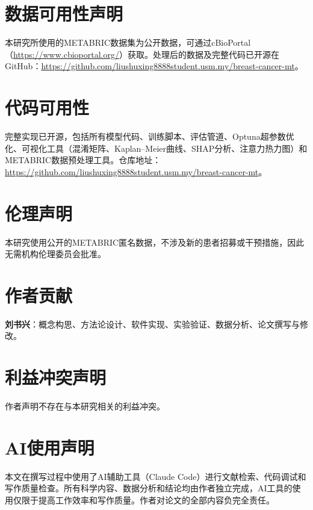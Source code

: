 \documentclass[conference]{IEEEtran}
\begin{document}

\section*{数据可用性声明}

本研究所使用的METABRIC数据集为公开数据，可通过cBioPortal（\url{https://www.cbioportal.org/}）获取。处理后的数据及完整代码已开源在GitHub：\url{https://github.com/liushuxing8888student.usm.my/breast-cancer-mt}。

\section*{代码可用性}

完整实现已开源，包括所有模型代码、训练脚本、评估管道、Optuna超参数优化、可视化工具（混淆矩阵、Kaplan--Meier曲线、SHAP分析、注意力热力图）和METABRIC数据预处理工具。仓库地址：\url{https://github.com/liushuxing8888student.usm.my/breast-cancer-mt}。

\section*{伦理声明}

本研究使用公开的METABRIC匿名数据，不涉及新的患者招募或干预措施，因此无需机构伦理委员会批准。

\section*{作者贡献}

\textbf{刘书兴}：概念构思、方法论设计、软件实现、实验验证、数据分析、论文撰写与修改。

\section*{利益冲突声明}

作者声明不存在与本研究相关的利益冲突。

\section*{AI使用声明}

本文在撰写过程中使用了AI辅助工具（Claude Code）进行文献检索、代码调试和写作质量检查。所有科学内容、数据分析和结论均由作者独立完成，AI工具的使用仅限于提高工作效率和写作质量。作者对论文的全部内容负完全责任。

\end{document}
